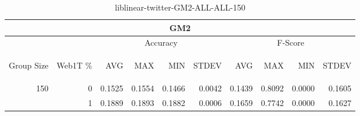 \begin{center}
\begin{table}[htbp] 
 \begin{center}
\begin{tabular}{ | r | r | r | r | r | r | r | r | r | r |}
\hline
\multicolumn{10}{|c|}{GM2}\\
\hline
 & & \multicolumn{4}{|c|}{Accuracy} & \multicolumn{4}{|c|}{F-Score}\\ \cline{3-10}
\begin{sideways}Group Size\end{sideways} & \begin{sideways}Web1T \%\end{sideways} & \begin{sideways}AVG\end{sideways} & \begin{sideways}MAX\end{sideways} & \begin{sideways}MIN\end{sideways} & \begin{sideways}STDEV\end{sideways} & \begin{sideways}AVG\end{sideways} & \begin{sideways}MAX\end{sideways} & \begin{sideways}MIN\end{sideways} & \begin{sideways}STDEV\end{sideways}\\
\hline
\multirow{1}{*}{150}
 & 0 & 0.1525 & 0.1554 & 0.1466 & 0.0042 & 0.1439 & 0.8092 & 0.0000 & 0.1605\\ \cline{2-10}
 & 1 & 0.1889 & 0.1893 & 0.1882 & 0.0006 & 0.1659 & 0.7742 & 0.0000 & 0.1627\\ \cline{2-10}
\hline
\end{tabular}
\caption{liblinear-twitter-GM2-ALL-ALL-150}
\label{table:liblinear-twitter-GM2-ALL-ALL-150}
\end{center}
 \end{table}
\end{center}


